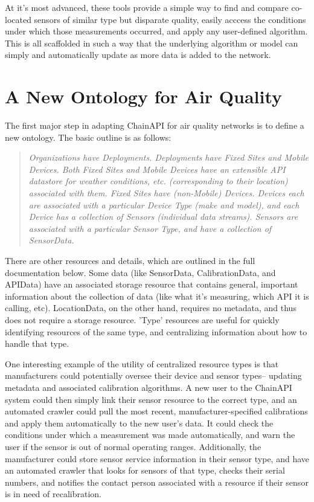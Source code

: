 At it's most advanced, these tools provide a simple way to find and compare co-located sensors of similar type but disparate quality, easily acccess the conditions under which those measurements occurred, and apply any user-defined algorithm.  This is all scaffolded in such a way that the underlying algorithm or model can simply and automatically update as more data is added to the network.    


\section{A New Ontology for Air Quality}

The first major step in adapting ChainAPI for air quality networks is to define a new ontology.  The basic outline is as follows:

\begin{quote}
\textit{Organizations have Deployments.  Deployments have Fixed Sites and Mobile Devices.  Both Fixed Sites and Mobile Devices have an extensible API datastore for weather conditions, etc. (corresponding to their location) associated with them.  Fixed Sites have (non-Mobile) Devices.  Devices each are associated with a particular Device Type (make and model), and each Device has a collection of Sensors (individual data streams).  Sensors are associated with a particular Sensor Type, and have a collection of SensorData.}
\end{quote}

There are other resources and details, which are outlined in the full documentation below.  Some data (like SensorData, CalibrationData, and APIData) have an associated storage resource that contains general, important information about the collection of data (like what it's measuring, which API it is calling, etc).  LocationData, on the other hand, requires no metadata, and thus does not require a storage resource.  'Type' resources are useful for quickly identifying resources of the same type, and centralizing information about how to handle that type.  

One interesting example of the utility of centralized resource types is that manufacturers could potentially oversee their device and sensor types-- updating metadata and associated calibration algorithms.  A new user to the ChainAPI system could then simply link their sensor resource to the correct type, and an automated crawler could pull the most recent, manufacturer-specified calibrations and apply them automatically to the new user's data.  It could check the conditions under which a measurement was made automatically, and warn the user if the sensor is out of normal operating ranges.  Additionally, the manufacturer could store sensor service information in their sensor type, and have an automated crawler that looks for sensors of that type, checks their serial numbers, and notifies the contact person associated with a resource if their sensor is in need of recalibration.
   
